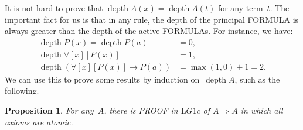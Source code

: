 \documentclass[10pt,a4paper]{article}
\newcommand*{\olup}[1]{\MakeUppercase{#1}}
\theoremstyle{plain}
\newtheorem{prop}[thm]{Proposition}
\theoremstyle{definition}
\theoremstyle{remark}
\newcommand*{\ollabel}[1]{\label{#1}}
\providecommand{\lif}{\mathbin{\rightarrow}}
\providecommand{\lforall}{\mathord{\forall}}
\providecommand{\Sequent}{\mathrel{\Rightarrow}}
\providecommand{\Log}{\ensuremath{\mathrm{L}}}
\providecommand{\depth}{\operatorname{depth}}
\begin{document}
It is not hard to prove that $\depth{A(x)} = \depth{A(t)}$ for any
term~$t$. The important fact for us is that in any rule, the depth of
the principal \olup{formula} is always greater than the depth of the
active \olup{formula}s. For instance, we have:
\begin{align*}
\depth{P(x)} = \depth{P(a)} & = 0,\\
\depth{\lforall[x][P(x)]} & = 1,\\
\depth{(\lforall[x][P(x)] \lif P(a))} & = \max(1,0) + 1 = 2.
\end{align*}
We can use this to prove some results by induction on~$\depth{A}$,
such as the following.

\begin{prop}\ollabel{prop:G1c-axioms}
For any~$A$, there is \olup{proof} in $\Log{G1c}$ of $A \Sequent A$
in which all axioms are atomic.
\end{prop}
\end{document}
